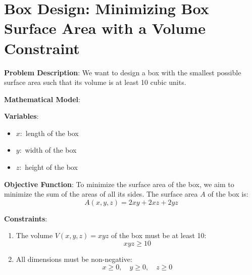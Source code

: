 


\section{Box Design: Minimizing Box Surface Area with a Volume Constraint}

\textbf{Problem Description}: 
We want to design a box with the smallest possible surface area such that its volume is at least 10 cubic units.

\textbf{Mathematical Model}:

\begin{minipage}{0.45\textwidth}
\textbf{Variables}:
\begin{itemize}
    \item \( x \colon \) length of the box
    \item \( y \colon \) width of the box
    \item \( z \colon \) height of the box
\end{itemize}
\end{minipage}
\begin{minipage}{0.45\textwidth}
\end{minipage}

\textbf{Objective Function}:
To minimize the surface area of the box, we aim to minimize the sum of the areas of all its sides. The surface area \( A \) of the box is:
\[ A(x,y,z) = 2xy + 2xz + 2yz \]

\textbf{Constraints}:
\begin{enumerate}
    \item The volume \( V(x,y,z) = xyz \) of the box must be at least 10:
    \[ xyz \geq 10 \]

    \item All dimensions must be non-negative:
    \[ x \geq 0, \quad y \geq 0, \quad z \geq 0 \]
\end{enumerate}


